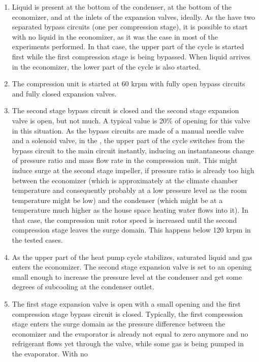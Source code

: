 \begin{enumerate}
\item Liquid is present at the bottom of the condenser, at the bottom
  of the economizer, and at the inlets of the expansion valves,
  ideally. As the \AWP{} have two separated bypass circuits (one per
  compression stage), it is possible to start with no liquid in the
  economizer, as it was the case in most of the experiments
  performed. In that case, the upper part of the cycle is started
  first while the first compression stage is being bypassed. When
  liquid arrives in the economizer, the lower part of the cycle is
  also started.
\item The compression unit is started at 60 krpm with fully open
  bypass circuits and fully closed expansion valves.
\item The second stage bypass circuit is closed and the second stage
  expansion valve is open, but not much. A typical value is 20\% of
  opening for this valve in this situation. As the bypass circuits are
  made of a manual needle valve and a solenoid valve, in the \AWP{},
  the upper part of the cycle switches from the bypass circuit to the
  main circuit instantly, inducing an instantaneous change of pressure
  ratio and mass flow rate in the compression unit. This might induce
  surge at the second stage impeller, if pressure ratio is already too
  high between the economizer (which is approximately at the climate
  chamber temperature and consequently probably at a low pressure
  level as the room temperature might be low) and the condenser (which
  might be at a temperature much higher as the house space heating
  water flows into it). In that case, the compression unit rotor speed
  is increased until the second compression stage leaves the surge
  domain. This happens below 120 krpm in the tested cases.
\item As the upper part of the heat pump cycle stabilizes, saturated
  liquid and gas enters the economizer. The second stage expansion
  valve is set to an opening small enough to increase the pressure
  level at the condenser and get some degrees of subcooling at the
  condenser outlet.
\item The first stage expansion valve is open with a small opening and
  the first compression stage bypass circuit is closed. Typically, the
  first compression stage enters the surge domain as the pressure
  difference between the economizer and the evaporator is already not
  equal to zero anymore and no refrigerant flows yet through the
  valve, while some gas is being pumped in the evaporator. With no

\end{enumerate}
